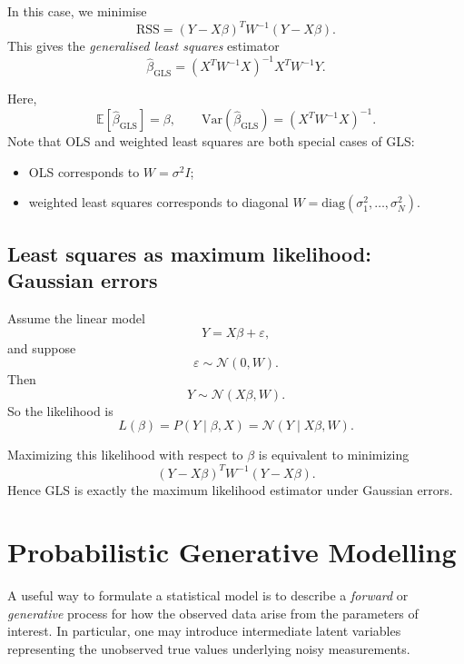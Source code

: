 \documentclass[11pt, titlepage]{article} %
\numberwithin{equation}{section}
\theoremstyle{definition}
\numberwithin{assumption}{section}
\begin{document}
In this case, we minimise
\begin{equation*}
    \mathrm{RSS}
    =
    (Y-X\beta)^T W^{-1}(Y-X\beta).
\end{equation*}
This gives the \textit{generalised least squares} estimator
\begin{equation*}
    \hat\beta_{\mathrm{GLS}}
    =
    (X^TW^{-1}X)^{-1}X^TW^{-1}Y.
\end{equation*}


Here, 
\begin{equation*}
    \mathbb{E}[\hat\beta_{\mathrm{GLS}}]=\beta, \qquad \mathrm{Var}(\hat\beta_{\mathrm{GLS}})
    =
    (X^TW^{-1}X)^{-1}.
\end{equation*}
Note that OLS and weighted least squares are both special cases of GLS:

\begin{itemize}
    \item OLS corresponds to $W=\sigma^2 I$;
    \item weighted least squares corresponds to diagonal $W=\mathrm{diag}(\sigma_1^2,\dots,\sigma_N^2)$.
\end{itemize}

\subsection{Least squares as maximum likelihood: Gaussian errors}

Assume the linear model
\begin{equation*}
    Y=X\beta+\varepsilon,
\end{equation*}
and suppose
\begin{equation*}
    \varepsilon \sim \mathcal{N}(0,W).
\end{equation*}
Then
\begin{equation*}
    Y\sim \mathcal{N}(X\beta,W).
\end{equation*}
So the likelihood is
\begin{equation*}
    L(\beta)=P(Y\mid \beta,X)=\mathcal{N}(Y\mid X\beta,W).
\end{equation*}

Maximizing this likelihood with respect to $\beta$ is equivalent to minimizing
\begin{equation*}
    (Y-X\beta)^TW^{-1}(Y-X\beta).
\end{equation*}
Hence GLS is exactly the maximum likelihood estimator under Gaussian errors.

\section{Probabilistic Generative Modelling}
A useful way to formulate a statistical model is to describe a \textit{forward} or \textit{generative} process for how the observed data arise from the parameters of interest. In particular, one may introduce intermediate latent variables representing the unobserved true values underlying noisy measurements.
\end{document}
